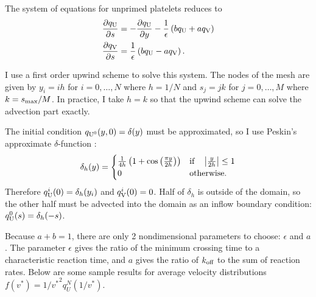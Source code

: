 \documentclass{article}
\newcommand{\tn}{\textnormal}
\newcommand{\dd}{d}
\newcommand{\Der}[2]{\frac{\dd #1}{\dd #2}}
\newcommand{\Pder}[2]{\frac{\partial #1}{\partial #2}}
\begin{document}
The system of equations for unprimed platelets reduces to
\begin{align}
  \label{eq:unprimed-1}
  \Pder{q_\tn{U}}{s} &= -\Pder{q_\tn{U}}{y} - \frac{1}{\epsilon}
                       \left(b q_\tn{U} + a q_\tn{V}\right) \\
  \label{eq:unprimed-2}
  \Pder{q_\tn{V}}{s} &= \frac{1}{\epsilon} \left(b q_\tn{U} - a
                       q_\tn{V}\right).
\end{align}

I use a first order upwind scheme to solve this system. The nodes of
the mesh are given by $y_i = ih$ for $i = 0, \hdots, N$ where
$h = 1/N$ and $s_j = jk$ for $j = 0, \hdots, M$ where $k =
s_\tn{max}/M$. In practice, I take $h = k$ so that the upwind scheme
can solve the advection part exactly.

The initial condition $q_{\tn{U}^0}(y, 0) = \delta(y)$ must be
approximated, so I use Peskin's approximate $\delta$-function
\cite{Peskin2002}:
\begin{equation}
  \label{eq:delta-h}
  \delta_h(y) =
  \begin{cases}
    \frac{1}{4h} \left( 1 + \cos\left(\frac{\pi y}{2h}\right) \right)
    & \tn{if} \quad \left|\frac{y}{2h}\right| \le 1 \\
    0 & \tn{otherwise.}
  \end{cases}
\end{equation}
Therefore $q_\tn{U}^i(0) = \delta_h(y_i)$ and $q_\tn{V}^i(0) =
0$. Half of $\delta_h$ is outside of the domain, so the other half
must be advected into the domain as an inflow boundary condition:
$q_\tn{U}^0(s) = \delta_h(-s)$.

Because $a + b = 1$, there are only 2 nondimensional parameters to
choose: $\epsilon$ and $a$. The parameter $\epsilon$ gives the ratio
of the minimum crossing time to a characteristic reaction time, and
$a$ gives the ratio of $k_\tn{off}$ to the sum of reaction
rates. Below are some sample results for average velocity
distributions $f(v^*) = 1/{v^*}^2 q_U^N(1/v^*)$. 
\end{document}
